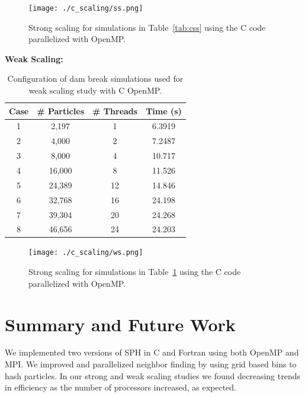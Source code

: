\documentclass{scrartcl}
\begin{document}
    \begin{figure}
    	\begin{center}
    		\texttt{[image: ./c\_scaling/ss.png]}
    		\caption{Strong scaling for simulations in Table~\ref{tab:css} using the C code parallelized with OpenMP.}
    		\label{fig:ss_c_omp}
    	\end{center}
    \end{figure}
    
    \textbf{Weak Scaling:}
    \begin{table}
    	\begin{center}
    		\begin{tabular}{| c | c | c | c |}
    			\hline
    			Case & \# Particles & \# Threads & Time (s) \\ \hline
    			1 &  2,197 &  1 & 6.3919 \\ \hline		  		
    			2 &  4,000 &  2 & 7.2487 \\ \hline		  		
    			3 &  8,000 &  4 & 10.717 \\ \hline		  		
    			4 & 16,000 &  8 & 11.526 \\ \hline		  		
    			5 & 24,389 & 12 & 14.846 \\ \hline		  		
    			6 & 32,768 & 16 & 24.198 \\ \hline		  		
    			7 & 39,304 & 20 & 24.268 \\ \hline		  		
    			8 & 46,656 & 24 & 24.203 \\ \hline		  		
    		\end{tabular}
    		\caption{Configuration of dam break simulations used for weak scaling study with C OpenMP.}
    		\label{tab:cws}
    	\end{center}
    \end{table}
    
    \begin{figure}
    	\begin{center}
    		\texttt{[image: ./c\_scaling/ws.png]}
    		\caption{Strong scaling for simulations in Table~\ref{tab:cws} using the C code parallelized with OpenMP.}
    		\label{fig:ws_c_omp}
    	\end{center}
    \end{figure}
    
  
\section{Summary and Future Work}
We implemented two versions of SPH in C and Fortran using both OpenMP and MPI. We improved and parallelized neighbor finding by using grid based bins to hash particles. In our strong and weak scaling studies we found decreasing trends in efficiency as the number of processors increased, as expected.
\end{document}
